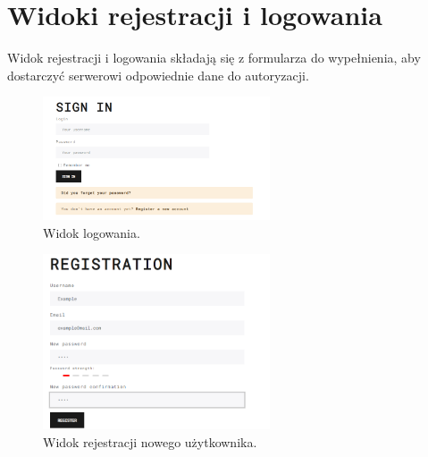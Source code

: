 \section{Widoki rejestracji i logowania}
Widok rejestracji i logowania składają się z formularza do wypełnienia, aby dostarczyć serwerowi odpowiednie dane do autoryzacji.
\begin{figure}[h!]
	\centering
	\includegraphics[width=0.60\textwidth]{loginstate}
	
	\caption{Widok logowania.}
	\label{login-state}
\end{figure}

\begin{figure}[h!]
	\centering
	\includegraphics[width=0.60\textwidth]{register}
	
	\caption{Widok rejestracji nowego użytkownika.}
	\label{register-state}
\end{figure}
\clearpage
